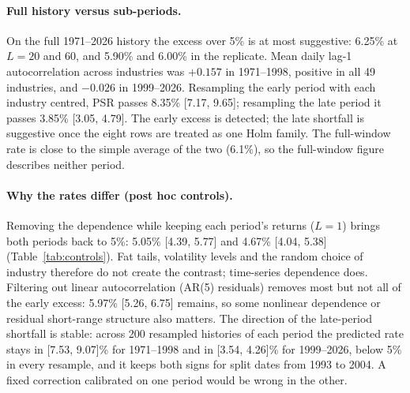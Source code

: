 \documentclass[11pt,a4paper]{article}
\begin{document}
\paragraph{Full history versus sub-periods.} On the full 1971--2026 history the excess over 5\% is at most suggestive: 6.25\% at $L=20$ and 60, and 5.90\% and 6.00\% in the replicate. Mean daily lag-1 autocorrelation across industries was $+0.157$ in 1971--1998, positive in all 49 industries, and $-0.026$ in 1999--2026. Resampling the early period with each industry centred, PSR passes 8.35\% [7.17, 9.65]; resampling the late period it passes 3.85\% [3.05, 4.79]. The early excess is detected; the late shortfall is suggestive once the eight rows are treated as one Holm family. The full-window rate is close to the simple average of the two (6.1\%), so the full-window figure describes neither period.

\paragraph{Why the rates differ (post hoc controls).} Removing the dependence while keeping each period's returns ($L=1$) brings both periods back to 5\%: 5.05\% [4.39, 5.77] and 4.67\% [4.04, 5.38] (Table~\ref{tab:controls}). Fat tails, volatility levels and the random choice of industry therefore do not create the contrast; time-series dependence does. Filtering out linear autocorrelation (AR(5) residuals) removes most but not all of the early excess: 5.97\% [5.26, 6.75] remains, so some nonlinear dependence or residual short-range structure also matters. The direction of the late-period shortfall is stable: across 200 resampled histories of each period the predicted rate stays in [7.53, 9.07]\% for 1971--1998 and in [3.54, 4.26]\% for 1999--2026, below 5\% in every resample, and it keeps both signs for split dates from 1993 to 2004. A fixed correction calibrated on one period would be wrong in the other.
\end{document}

